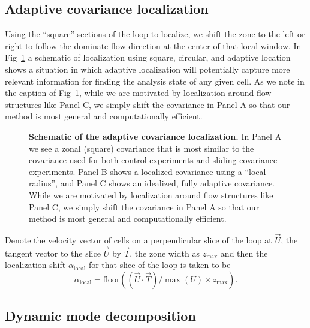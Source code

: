 \documentclass[10pt,letterpaper]{article}
\begin{document}
\subsection*{Adaptive covariance localization}

Using the ``square'' sections of the loop to localize, we shift the zone to the left or right to follow the dominate flow direction at the center of that local window.
In Fig~\ref{fig:covariance-localization-schematic} a schematic of localization using square, circular, and adaptive location shows a situation in which adaptive localization will potentially capture more relevant information for finding the analysis state of any given cell.
As we note in the caption of Fig~\ref{fig:covariance-localization-schematic}, while we are motivated by localization around flow structures like Panel C, we simply shift the covariance in Panel A so that our method is most general and computationally efficient.

\begin{figure}[h]
  \centering
  \caption[]{
\textbf{    Schematic of the adaptive covariance localization.
}    In Panel A we see a zonal (square) covariance that is most similar to the covariance used for both control experiments and sliding covariance experiments.
    Panel B shows a localized covariance using a ``local radius'', and Panel C shows an idealized, fully adaptive covariance.
    While we are motivated by localization around flow structures like Panel C, we simply shift the covariance in Panel A so that our method is most general and computationally efficient.
  }
  \label{fig:covariance-localization-schematic}
\end{figure}

Denote the velocity vector of cells on a perpendicular slice of the loop at $\vec{U}$, the tangent vector to the slice $\vec{U}$ by $\vec{T}$, the zone width as $z_{\text{max}}$ and then the localization shift $\alpha_{\text{local}}$ for that slice of the loop is taken to be
\begin{equation} \alpha_{\text{local}} = \text{floor} \left( (\vec{U} \cdot \vec{T})/\max (U) \times z_{\text{max}} \right) . \end{equation}

\subsection*{Dynamic mode decomposition}
\end{document}
